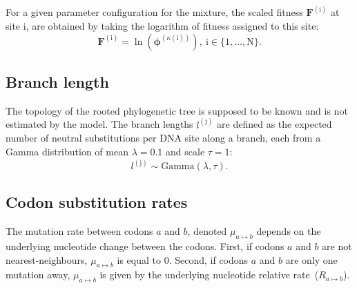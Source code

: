 \documentclass{article}
\newcommand{\UniDimArray}[1]{\bm{#1}}
\newcommand{\fit}{F}
\newcommand{\Fit}{\UniDimArray{\fit}}
\newcommand{\ci}{{a}}
\newcommand{\cj}{{b}}
\newcommand{\itoj}{\ci \mapsto \cj}
\newcommand{\mutmatrix}{R}
\newcommand{\branch}{\text{j}}
\newcommand{\branchexp}{^{(\branch)}}
\newcommand{\branchlength}{l}
\newcommand{\site}{\text{i}}
\newcommand{\Nsite}{\text{N}}
\newcommand{\siteexp}{^{(\site)}}
\newcommand{\Setsite}{\site \in \{1, \hdots, \Nsite\} }
\newcommand{\profile}{\phi}
\newcommand{\Profile}{\UniDimArray{\profile}}
\newcommand{\catVar}{\kappa}
\newcommand{\catsite}{\catVar\left(\site\right)}
\begin{document}
    For a given parameter configuration for the mixture, the scaled fitness $\Fit\siteexp$ at site $\site$, are obtained by taking the logarithm of fitness assigned to this site:
    \begin{equation}
        \label{eq:sitefitness}
        \Fit\siteexp = \ln \left( \Profile^{\left( \catsite \right)} \right),\ \Setsite.
    \end{equation}

    \subsection{Branch length}
    The topology of the rooted phylogenetic tree is supposed to be known and is not estimated by the model.
    The branch lengths $\branchlength\branchexp$ are defined as the expected number of {neutral} substitutions per {DNA} site along a branch, each from a Gamma distribution of mean $\lambda=0.1$ and scale $\tau=1$:
    \begin{equation}
        \label{eq:branchlength}
        \branchlength\branchexp \sim \text{Gamma}\left( \lambda, \tau \right).
    \end{equation}

    \subsection{Codon substitution rates}

    The mutation rate between codons $\ci$ and $\cj$, denoted $\mu_{\itoj}$ depends on the underlying nucleotide change between the codons.
    First, if codons $\ci$ and $\cj$ are not nearest-neighbours, $\mu_{\itoj}$ is equal to $0$.
    Second, if codons $\ci$ and $\cj$ are only one mutation away, $\mu_{\itoj}$ is given by the underlying nucleotide relative rate~(${\mutmatrix_{\itoj}}$).
\end{document}
